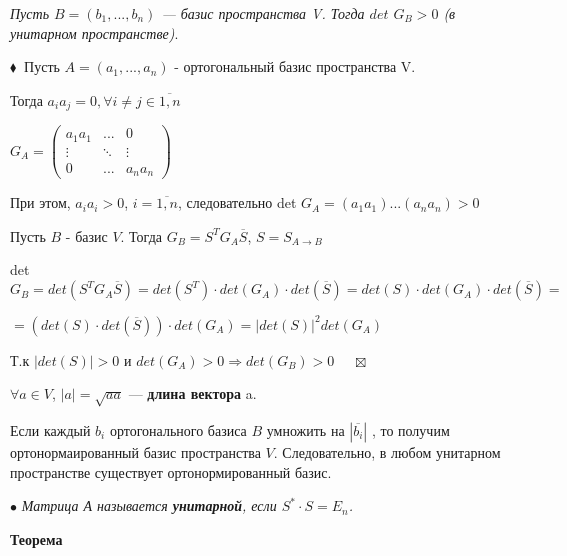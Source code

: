 \documentclass[a4paper, 12pt]{report}
\begin{document}
	\textit{Пусть $B = (b_1, ..., b_n)$ --- базис пространства V. Тогда $det$ $G_B > 0$ (в унитарном пространстве)}.
	\par\bigskip
	$\blacklozenge\ $
	Пусть $A = (a_1, ..., a_n)$ - ортогональный базис пространства V.
	\par\bigskip
	Тогда $a_ia_j = 0, \forall i \neq j \in \overline{1,n}$
	\par\bigskip
	$G_A=\begin{pmatrix}a_1a_1&...& 0\\ \vdots & \ddots  & \vdots \\ 0&...& a_na_n\end{pmatrix}$
	\par\bigskip
	При этом, $a_ia_i > 0$, $i = \overline{1,n}$, следовательно det $G_A = (a_1a_1)...(a_na_n)>0$
	\par\bigskip
	Пусть $B$ - базис $V$. Тогда $G_B = S^T G_A \overline{S}$, $S=S_{A\rightarrow B}$
	\par\bigskip
	det $G_B = det(S^T G_A \overline{S})=det(S^T)\cdot det(G_A)\cdot det(\overline{S})=det(S)\cdot det(G_A)\cdot det(\overline{S})=$\par$=(det(S)\cdot det(\overline{S}))\cdot det(G_A) = |det(S)|^2det(G_A)$ 
	\par\bigskip
	Т.к $|det(S)|>0$ и $det(G_A)>0 \Rightarrow det(G_B)>0$
	$ \quad \boxtimes$
	\par\bigskip
	$\forall a \in V$,  $|a|=\sqrt{aa}$ --- \textbf{длина вектора} a.
	\par\bigskip
	Если каждый $b_i$ ортогонального базиса $B$ умножить на $|\overline{b_i}|$ , то получим ортонормаированный базис пространства $V$. Следовательно, в любом унитарном пространстве существует ортонормированный базис.
	\par\bigskip
	$\bullet$\textit{ Матрица А называется \textbf{унитарной}, если $S^*\cdot S=E_n$.}
	\par\bigskip
	\textbf{Теорема}
	
\end{document}
